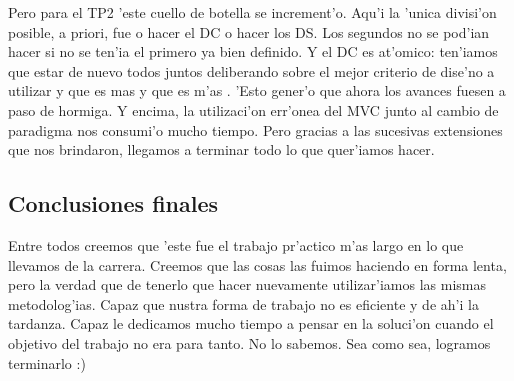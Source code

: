 Pero para el TP2 'este cuello de botella se increment'o. Aqu'i la 'unica divisi'on posible, a priori, fue o hacer el DC o hacer los DS. Los segundos no se pod'ian hacer si no se ten'ia el primero ya bien definido. Y el DC es at'omico: ten'iamos que estar de nuevo todos juntos deliberando sobre el mejor criterio de dise'no a utilizar y que es mas  y que es m'as . 'Esto gener'o que ahora los avances fuesen a paso de hormiga. Y encima, la utilizaci'on err'onea del MVC junto al cambio de paradigma nos consumi'o mucho tiempo. Pero gracias a las sucesivas extensiones que nos brindaron, llegamos a terminar todo lo que quer'iamos hacer.


\subsection{Conclusiones finales}
Entre todos creemos que 'este fue el trabajo pr'actico m'as largo en lo que llevamos de la carrera. Creemos que las cosas las fuimos haciendo en forma lenta, pero la verdad que de tenerlo que hacer nuevamente utilizar'iamos las mismas metodolog'ias. Capaz que nustra forma de trabajo no es eficiente y de ah'i la tardanza. Capaz le dedicamos mucho tiempo a pensar en la  soluci'on cuando el objetivo del trabajo no era para tanto. No lo sabemos. Sea como sea, logramos terminarlo :)
